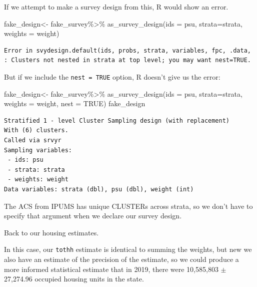 \documentclass[
  letterpaper,
  DIV=11,
  numbers=noendperiod]{scrreprt}
\newenvironment{Shaded}{\begin{snugshade}}{\end{snugshade}}
\newcommand{\AttributeTok}[1]{\textcolor[rgb]{0.40,0.45,0.13}{#1}}
\newcommand{\ConstantTok}[1]{\textcolor[rgb]{0.56,0.35,0.01}{#1}}
\newcommand{\FunctionTok}[1]{\textcolor[rgb]{0.28,0.35,0.67}{#1}}
\newcommand{\NormalTok}[1]{\textcolor[rgb]{0.00,0.23,0.31}{#1}}
\newcommand{\OtherTok}[1]{\textcolor[rgb]{0.00,0.23,0.31}{#1}}
\newcommand{\SpecialCharTok}[1]{\textcolor[rgb]{0.37,0.37,0.37}{#1}}
\begin{document}
If we attempt to make a survey design from this, R would show an error.

\begin{Shaded}
\begin{Highlighting}[]
\NormalTok{fake\_design}\OtherTok{\textless{}{-}}\NormalTok{ fake\_survey}\SpecialCharTok{\%\textgreater{}\%}
  \FunctionTok{as\_survey\_design}\NormalTok{(}\AttributeTok{ids =}\NormalTok{ psu,}
                    \AttributeTok{strata=}\NormalTok{strata,}
                    \AttributeTok{weights =}\NormalTok{ weight)}
\end{Highlighting}
\end{Shaded}

\begin{verbatim}
Error in svydesign.default(ids, probs, strata, variables, fpc, .data, : Clusters not nested in strata at top level; you may want nest=TRUE.
\end{verbatim}

But if we include the \texttt{nest\ =\ TRUE} option, R doesn't give us
the error:

\begin{Shaded}
\begin{Highlighting}[]
\NormalTok{fake\_design}\OtherTok{\textless{}{-}}\NormalTok{ fake\_survey}\SpecialCharTok{\%\textgreater{}\%}
  \FunctionTok{as\_survey\_design}\NormalTok{(}\AttributeTok{ids =}\NormalTok{ psu,}
                  \AttributeTok{strata=}\NormalTok{strata,}
                  \AttributeTok{weights =}\NormalTok{ weight, }
                  \AttributeTok{nest =} \ConstantTok{TRUE}\NormalTok{)}
\NormalTok{fake\_design}
\end{Highlighting}
\end{Shaded}

\begin{verbatim}
Stratified 1 - level Cluster Sampling design (with replacement)
With (6) clusters.
Called via srvyr
Sampling variables:
 - ids: psu
 - strata: strata
 - weights: weight
Data variables: strata (dbl), psu (dbl), weight (int)
\end{verbatim}

The ACS from IPUMS has unique CLUSTERs across strata, so we don't have
to specify that argument when we declare our survey design.

Back to our housing estimates.

In this case, our \texttt{tothh} estimate is identical to summing the
weights, but new we also have an estimate of the precision of the
estimate, so we could produce a more informed statistical estimate that
in 2019, there were 10,585,803 \(\pm\) 27,274.96 occupied housing units
in the state.
\end{document}
